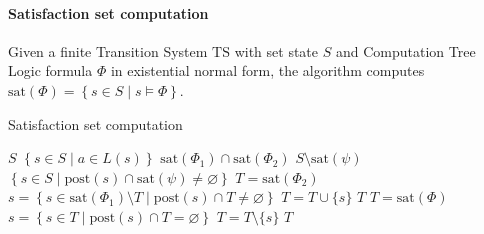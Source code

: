 \paragraph*{Satisfaction set computation}
Given a finite Transition System $\text{TS}$ with set state $S$ and Computation Tree Logic formula $\Phi$ in existential normal form, the algorithm computes $\text{sat}(\Phi)=\left\{s\in S\mid s\models\Phi\right\}$.
\begin{algorithm}[H]
    \caption{Satisfaction set computation}
        \begin{algorithmic}[1]
            \Repeat     
                \Switch{$\Phi$}
                        \State \Return $S$
                    \EndCase
                        \State \Return $\left\{s\in S\mid a \in L(s)\right\}$
                    \EndCase
                        \State \Return $\text{sat}(\Phi_1)\cap\text{sat}(\Phi_2)$
                    \EndCase
                    \Case{$\lnot\psi$}
                        \State \Return $S\setminus\text{sat}(\psi)$
                    \EndCase
                    \Case{$\exists\circ\psi$}
                        \State \Return $\left\{s\in S\mid\text{post}(s)\cap\text{sat}(\psi)\neq\varnothing\right\}$
                    \EndCase
                        \State $T=\text{sat}(\Phi_2)$ 
                            \State $s= \left\{s\in\text{sat}(\Phi_1)\setminus T\mid\text{post}(s)\cap T\neq \varnothing\right\}$
                            \State $T=T\cup\{s\}$ 
                        \EndWhile 
                        \State \Return $T$
                    \EndCase
                    \Case{$\exists\square\phi$}
                        \State $T=\text{sat}(\Phi)$ 
                            \State $s= \left\{s\in T\mid\text{post}(s)\cap T= \varnothing\right\}$
                            \State $T=T\setminus\{s\}$ 
                        \EndWhile 
                        \State \Return $T$
                    \EndCase
                \EndSwitch
        \end{algorithmic}
\end{algorithm}
